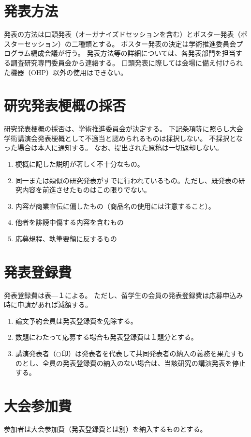 \documentclass[base=10pt,magstyle=real,a4paper,twocolumn,xelatex,pandoc,jafont=ms]{bxjsarticle}
\begin{document}
\section{発表方法}
発表の方法は口頭発表（オーガナイズドセッションを含む）とポスター発表（ポスターセッション）の二種類とする。
ポスター発表の決定は学術推進委員会プログラム編成会議が行う。
発表方法等の詳細については、各発表部門を担当する調査研究専門委員会から連絡する。
口頭発表に際しては会場に備え付けられた機器（OHP）以外の使用はできない。

\section{研究発表梗概の採否}
研究発表梗概の採否は、学術推進委員会が決定する。
下記条項等に照らし大会学術講演会発表梗概として不適当と認められるものは採択しない。
不採択となった場合は本人に通知する。
なお、提出された原稿は一切返却しない。
\begin{enumerate}
\item 梗概に記した説明が著しく不十分なもの。
\item 同一または類似の研究発表がすでに行われているもの。ただし、既発表の研究内容を前進させたものはこの限りでない。
\item 内容が商業宣伝に偏したもの（商品名の使用には注意すること）。
\item 他者を誹謗中傷する内容を含むもの
\item 応募規程、執筆要領に反するもの
\end{enumerate}

\section{発表登録費}
発表登録費は表—１による。
ただし、留学生の会員の発表登録費は応募申込み時に申請があれば減額する。
\begin{enumerate}
	\item 論文予約会員は発表登録費を免除する。
	\item 数題にわたって応募する場合も発表登録費は１題分とする。
	\item 講演発表者（$\bigcirc$印）は発表者を代表して共同発表者の納入の義務を果たすものとし、全員の発表登録費の納入のない場合は、当該研究の講演発表を停止する。
\end{enumerate}

\section{大会参加費}
	参加者は大会参加費（発表登録費とは別）を納入するものとする。
\end{document}
